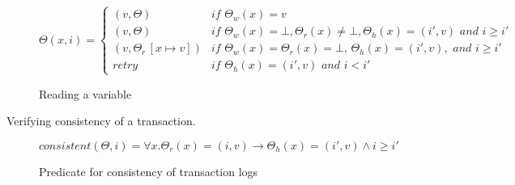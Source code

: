 \documentclass{jfp1}
\newcommand{\Retry}{\textit{retry}}
\begin{document}
     \begin{figure}[h]
         \[
               \Theta(x,i) = \left\{
                      \begin{array}{ll}
                           (v,\Theta) & \textit{if } \Theta_w(x) = v\\
                           (v,\Theta) & \textit{if } \Theta_w(x) = \bot,
                                        \Theta_r(x) \neq \bot, 
                                        \Theta_h(x) = (i',v)
                                        \textit{ and } i \geq i'\\
                           (v, \Theta_r\,[x \mapsto v]) & 
                                  \textit{if } \Theta_w(x) =
                                                  \Theta_r(x) = \bot,\,
                                  \Theta_h(x) = (i',v),
                                     \textit{ and } i \geq i' \\
                           \Retry & \textit{if } \Theta_h(x) = (i',v)
                                    \textit{ and } i < i'
                      \end{array}
                                  \right.
         \]
         \centering
         \caption{Reading a variable}
         \label{fig:readvar}
     \end{figure}

     Verifying consistency of a transaction.

     \begin{figure}[h]
        \[
          consistent(\Theta,i) = \forall x. \Theta_r(x) = (i,v) \to
          \Theta_h(x) = (i',v) \land i \geq i'
        \]
        \centering
        \caption{Predicate for consistency of transaction logs}
        \label{fig:consistency}
     \end{figure}
\end{document}
